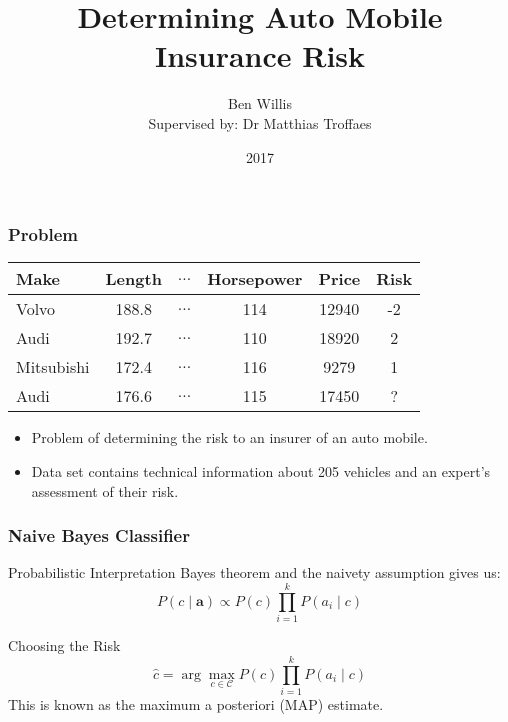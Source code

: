 \documentclass{beamer}
\title{Determining Auto Mobile Insurance Risk}
\author[Ben Willis]{Ben Willis \\ \scriptsize{ Supervised by: Dr Matthias Troffaes}}
\institute{Durham University}
\date{2017}
\begin{document}
 
\frame{\titlepage}

\begin{frame}
	\frametitle{Problem}
	\begin{center}
		\begin{tabular}{l c c c c|c}
			Make       & Length & $\dots$ & Horsepower & Price & Risk \\
			\hline
			Volvo      & 188.8  & $\dots$ & 114        & 12940 & -2   \\
			Audi       & 192.7  & $\dots$ & 110        & 18920 & 2    \\
			Mitsubishi & 172.4  & $\dots$ & 116        & 9279  & 1    \\
			Audi       & 176.6  & $\dots$ & 115        & 17450 & ?
		\end{tabular}
	\end{center}
	\begin{itemize}
		\item Problem of determining the risk to an insurer of an auto mobile.
		\item Data set contains technical information about 205 vehicles and an expert's assessment of their risk.
	\end{itemize}
\end{frame}

\begin{frame}
	\frametitle{Naive Bayes Classifier}
		\begin{block}{Probabilistic Interpretation}
			Bayes theorem and the naivety assumption gives us:
			\begin{equation}
				P(c \mid \mathbf{a}) \propto P(c)\prod_{i=1}^{k}P(a_i \mid c)
			\end{equation}
		\end{block}
		\begin{block}{Choosing the Risk}
			\begin{equation}
				\hat c = \arg\max_{c \in \mathcal{C}} P(c)\prod_{i=1}^{k}P(a_i \mid c)
			\end{equation}
			This is known as the maximum a posteriori (MAP) estimate.
		\end{block}
\end{frame}
\end{document}
